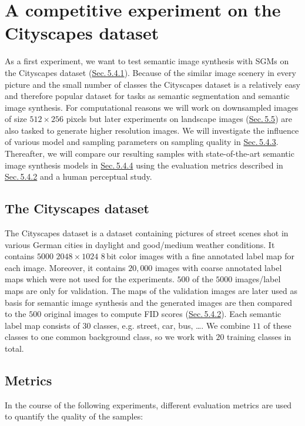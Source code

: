
\section[A competitive experiment on the Cityscapes dataset]{A competitive experiment on the Cityscapes dataset%
    } \label{sec:5.4}
%
As a first experiment, we want to test semantic image synthesis with SGMs on the Cityscapes dataset \cite{cityscapes} (\hyperref[sec:5.4.1]{Sec.\,5.4.1}). Because of the similar image scenery in every picture and the small number of classes the Cityscapes dataset is a relatively easy and therefore popular dataset for tasks as semantic segmentation and semantic image synthesis. For computational reasons we will work on downsampled images of size $512\times256$ pixels but later experiments on landscape images (\hyperref[sec:5.5]{Sec.\,5.5}) are also tasked to generate higher resolution images. We will investigate the influence of various model and sampling parameters on sampling quality in \hyperref[sec:5.4.3]{Sec.\,5.4.3}. Thereafter, we will compare our resulting samples with state-of-the-art semantic image synthesis models in \hyperref[sec:5.4.4]{Sec.\,5.4.4} using the evaluation metrics described in \hyperref[sec:5.4.2]{Sec.\,5.4.2} and a human perceptual study.

\subsection{The Cityscapes dataset}
The Cityscapes dataset \cite{cityscapes} is a dataset containing pictures of street scenes shot in various German cities in daylight and good/medium weather conditions. It contains $5000$ $2048\times1024$ $8$\,bit color images with a fine annotated label map for each image. Moreover, it contains $20{,}000$ images with coarse annotated label maps which were not used for the experiments. $500$ of the $5000$ images/label maps are only for validation. The maps of the validation images are later used as basis for semantic image synthesis and the generated images are then compared to the $500$ original images to compute FID scores (\hyperref[sec:fid]{Sec.\,5.4.2}). Each semantic label map consists of $30$ classes, e.g. street, car, bus, \dots. We combine $11$ of these classes to one common background class, so we work with $20$ training classes in total.
%
\subsection{Metrics} \label{sec:5.4.2}
In the course of the following experiments, different evaluation metrics are used to quantify the quality of the samples:
%
